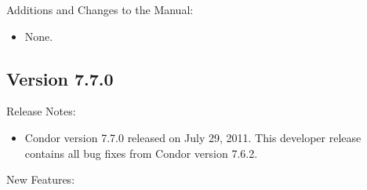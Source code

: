 \noindent Additions and Changes to the Manual:

\begin{itemize}

\item None.

\end{itemize}


\subsection*{\label{sec:New-7-7-0}Version 7.7.0}

\noindent Release Notes:

\begin{itemize}

\item Condor version 7.7.0 released on July 29, 2011.
This developer release contains all bug fixes from Condor version 7.6.2.

\end{itemize}


\noindent New Features:

